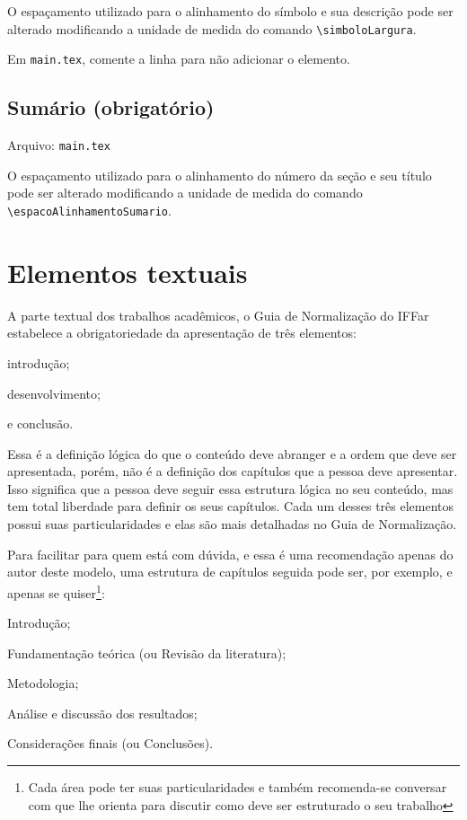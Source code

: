     O espaçamento utilizado para o alinhamento do símbolo e sua descrição pode ser alterado modificando a unidade de medida do comando \verb|\simboloLargura|.

    Em \texttt{main.tex}, comente a linha \verb|| para não adicionar o elemento.
    
\subsection{Sumário (obrigatório)}
    Arquivo: \texttt{main.tex}

    O espaçamento utilizado para o alinhamento do número da seção e seu título pode ser alterado modificando a unidade de medida do comando \verb|\espacoAlinhamentoSumario|.
    

\section{Elementos textuais}
    A parte textual dos trabalhos acadêmicos, o Guia de Normalização do IFFar estabelece a obrigatoriedade da apresentação de três elementos:
        \begin{alinea}
            \item introdução;
            \item desenvolvimento;
            \item e conclusão.
        \end{alinea}
    Essa é a definição lógica do que o conteúdo deve abranger e a ordem que deve ser apresentada, porém, não é a definição dos capítulos que a pessoa deve apresentar. Isso significa que a pessoa deve seguir essa estrutura lógica no seu conteúdo, mas tem total liberdade para definir os seus capítulos. Cada um desses três elementos possui suas particularidades e elas são mais detalhadas no Guia de Normalização.

    Para facilitar para quem está com dúvida, e essa é uma recomendação apenas do autor deste modelo, uma estrutura de capítulos seguida pode ser, por exemplo, e apenas se quiser\footnote{Cada área pode ter suas particularidades e também recomenda-se conversar com que lhe orienta para discutir como deve ser estruturado o seu trabalho}: 
        \begin{alinea}
            \item Introdução;
            \item Fundamentação teórica (ou Revisão da literatura);
            \item Metodologia;
            \item Análise e discussão dos resultados;
            \item Considerações finais (ou Conclusões).
        \end{alinea}

